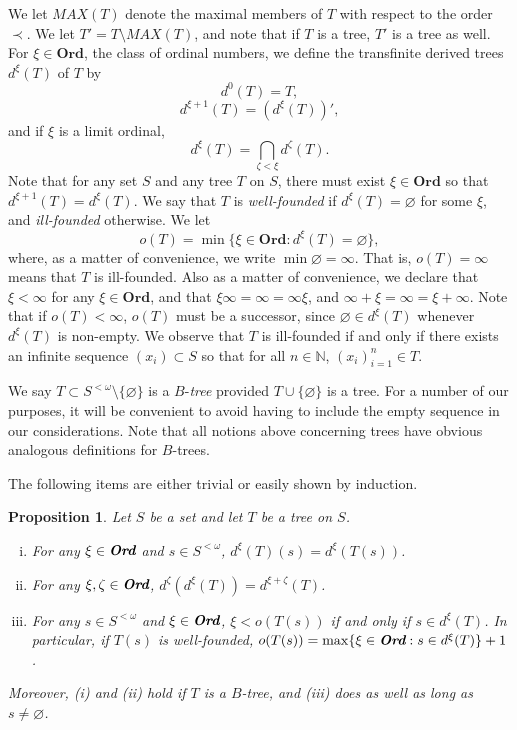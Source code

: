 \documentclass[12pt]{amsart}
\newtheorem{proposition}[theorem]{Proposition}
\theoremstyle{definition}
\newcommand{\ord}{\textbf{Ord}}
\newcommand{\nn}{\mathbb{N}}
\begin{document}
We let $MAX(T)$ denote the maximal members of $T$ with respect to the order $\prec$.  We let $T'=T\setminus MAX(T)$, and note that if $T$ is a tree, $T'$ is a tree as well. For $\xi\in \ord$, the class of ordinal numbers, we define the transfinite derived trees $d^\xi(T)$ of $T$ by $$d^0(T)=T,$$ $$d^{\xi+1}(T)=(d^\xi(T))',$$ and if $\xi$ is a limit ordinal, $$d^\xi(T)=\bigcap_{\zeta<\xi} d^\zeta(T).$$  Note that for any set $S$ and any tree $T$ on $S$, there must exist $\xi\in \ord$ so that $d^{\xi+1}(T)=d^\xi(T)$.  We say that $T$ is \emph{well-founded} if $d^\xi(T)=\varnothing$ for some $\xi$, and \emph{ill-founded} otherwise. We let $$o(T)=\min \{\xi\in \ord: d^\xi(T)=\varnothing\},$$ where, as a matter of convenience, we write $\min \varnothing = \infty$.  That is, $o(T)=\infty$ means that $T$ is ill-founded.  Also as a matter of convenience, we declare that $\xi<\infty$ for any $\xi\in \ord$, and that $\xi\infty = \infty = \infty \xi$, and $\infty+\xi=\infty=\xi+\infty$.  Note that if $o(T)<\infty$, $o(T)$ must be a successor, since $\varnothing \in d^\xi(T)$ whenever $d^\xi(T)$ is non-empty.  We observe that $T$ is ill-founded if and only if there exists an infinite sequence $(x_i)\subset S$ so that for all $n\in \nn$, $(x_i)_{i=1}^n\in T$.  

We say $T\subset S^{<\omega}\setminus \{\varnothing\}$ is a $B$-\emph{tree} provided $T\cup \{\varnothing\}$ is a tree.  For a number of our purposes, it will be convenient to avoid having to include the empty sequence in our considerations.  Note that all notions above concerning trees have obvious analogous definitions for $B$-trees.  



The following items are either trivial or easily shown by induction.  

\begin{proposition} Let $S$ be a set and let $T$ be a tree on $S$.  \begin{enumerate}[(i)]\item For any $\xi\in \emph{\ord}$ and $s\in S^{<\omega}$, $d^\xi(T)(s)=d^\xi(T(s))$. \item For any $\xi, \zeta\in \emph{\ord}$, $d^\zeta(d^\xi(T))=d^{\xi+\zeta}(T)$. \item For any $s\in S^{<\omega}$ and $\xi\in \emph{\ord}$, $\xi<o(T(s))$ if and only if $s\in d^\xi(T)$.  In particular, if $T(s)$ is well-founded, $o(T(s))=\max\{\xi\in \emph{\ord}: s\in d^\xi(T)\}+1$.  

\end{enumerate}

Moreover, (i) and (ii) hold if $T$ is a $B$-tree, and (iii) does as well as long as $s\neq \varnothing$.  



\label{derivation prop}

\end{proposition}
\end{document}

